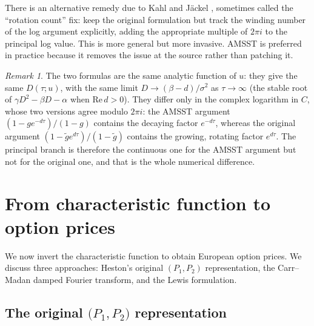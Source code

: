 \documentclass[11pt]{article}
\theoremstyle{plain}
\theoremstyle{definition}
\theoremstyle{remark}
\newtheorem{remark}[theorem]{Remark}
\begin{document}
There is an alternative remedy due to Kahl and J\"ackel \cite{KahlJaeckel2005}, sometimes called the ``rotation count'' fix: keep the original formulation but track the winding number of the log argument explicitly, adding the appropriate multiple of \(2\pi i\) to the principal log value. This is more general but more invasive. AMSST is preferred in practice because it removes the issue at the source rather than patching it.

\begin{remark}
    The two formulas are the same analytic function of \(u\): they give the same \(D(\tau; u)\), with the same limit \(D \to (\beta - d)/\sigma^2\) as \(\tau \to \infty\) (the stable root of \(\gamma D^2 - \beta D - \alpha\) when \(\mathrm{Re}\, d > 0\)). They differ only in the complex logarithm in \(C\), whose two versions agree modulo \(2\pi i\): the AMSST argument \((1 - g e^{-d\tau})/(1 - g)\) contains the decaying factor \(e^{-d\tau}\), whereas the original argument \((1 - \tilde g e^{d\tau})/(1 - \tilde g)\) contains the growing, rotating factor \(e^{d\tau}\). The principal branch is therefore the continuous one for the AMSST argument but not for the original one, and that is the whole numerical difference.
\end{remark}

\section{From characteristic function to option prices}

We now invert the characteristic function to obtain European option prices. We discuss three approaches: Heston's original \((P_1, P_2)\) representation, the Carr--Madan damped Fourier transform, and the Lewis formulation.

\subsection{The original \(\bigl(P_1, P_2\bigr)\) representation}
\end{document}
